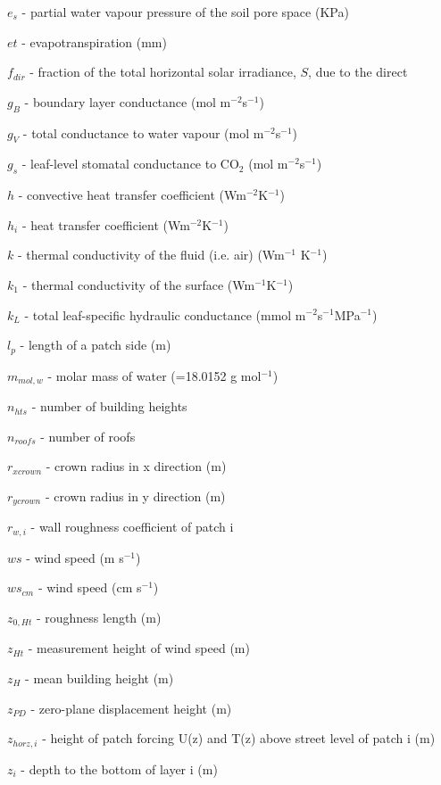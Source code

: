 {\begin{description}
\item $e_{s}$  -  partial water vapour pressure of the soil pore space (KPa) 
\item $et$  -  evapotranspiration (mm) 
\item $f_{dir}$  -  fraction of the total horizontal solar irradiance, $S$, due to the direct 
\item $g_{B}$  -  boundary layer conductance (mol m$^{-2}$s$^{-1}$) 
\item $g_{V}$   -  total conductance to water vapour (mol m$^{-2}$s$^{-1}$) 
\item $g_{s}$  -  leaf-level stomatal conductance to CO$_{2}$ (mol m$^{-2}$s$^{-1}$) 
\item $h$  -  convective heat transfer coefficient (Wm$^{-2}$K$^{-1}$) 
\item $h_{i}$  -   heat transfer coefficient (Wm$^{-2}$K$^{-1}$) 
\item $k$  -  thermal conductivity of the fluid (i.e. air) (Wm$^{-1}$ K$^{-1}$) 
\item $k_{1}$  -  thermal conductivity of the surface (Wm$^{-1}$K$^{-1}$) 
\item $k_{L}$  -  total leaf-specific hydraulic conductance (mmol m$^{-2}$s$^{-1}$MPa$^{-1}$) 
\item $l_{p}$  -  length of a patch side (m) 
\item $m_{mol,w}$  -  molar mass of water (=18.0152 g mol$^{-1}$) 
\item $n _{hts}$  -  number of building heights 
\item $n _{roofs}$  -  number of roofs 
\item $r _{xcrown}$  -  crown radius in x direction (m) 
\item $r _{ycrown}$  -  crown radius in y direction (m) 
\item $r_{w,i}$  -  wall roughness coefficient of patch i 
\item $ws$  -  wind speed (m s$^{-1}$) 
\item $ws_{cm}$  -  wind speed (cm s$^{-1}$) 
\item $z_{0,Ht}$  -  roughness length (m) 
\item $z_{Ht}$  -  measurement height of wind speed (m) 
\item $z_{H}$  -  mean building height (m) 
\item $z_{PD}$  -   zero-plane displacement height (m) 
\item $z_{horz,i}$  -  height of patch forcing U(z) and T(z) above street level of patch i (m) 
\item $z_{i}$  -  depth to the bottom of layer i (m) 


\end{description}
}
